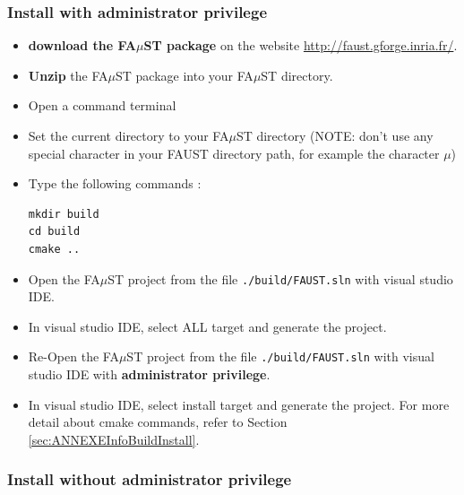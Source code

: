 \subsubsection{Install with administrator privilege}
\label{sec:AdminWinVisualStudioBasicInstall}
\begin{itemize}
\item \textbf{download the FA$\mu$ST package} on the website  \url{http://faust.gforge.inria.fr/}. 
\item \textbf{Unzip} the FA$\mu$ST package into your FA$\mu$ST directory. 

\item Open a command terminal
\item Set the current directory to your FA$\mu$ST directory (NOTE: don't use any special character in your FAUST directory path, for example the character $\mu$)
\item Type the following commands : 
\begin{lstlisting}
mkdir build
cd build
cmake .. 
\end{lstlisting}
\item Open the FA$\mu$ST project from the file \texttt{./build/FAUST.sln} with visual studio IDE.
\item In visual studio IDE, select ALL target and generate the project.
\item Re-Open the FA$\mu$ST project from the file \texttt{./build/FAUST.sln} with visual studio IDE with \textbf{administrator privilege}.
\item In visual studio IDE, select install target and generate the project.
For more detail about cmake commands, refer to Section \ref{sec:ANNEXEInfoBuildInstall}.
\end{itemize}

 
\subsubsection{Install without administrator privilege}
\label{sec:NoAdminWinVisualStudioBasicInstall}

